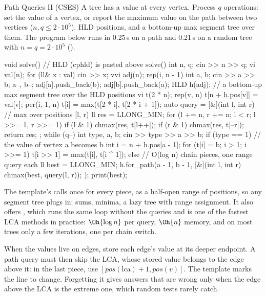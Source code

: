 \begin{problem}{Path Queries II (CSES)}
A tree has a value at every vertex. Process $q$ operations: set the value of a vertex, or report the maximum value on the path
between two vertices ($n, q \le 2 \cdot 10^5$).
\solution HLD positions, and a bottom-up max segment tree over them. The program below runs in 0.25\,s on a path and 0.21\,s on a
random tree with $n = q = 2 \cdot 10^5$ ().
\end{problem}

\begin{code}
void solve() {  // HLD (cphld) is pasted above solve()
    int n, q;
    cin >> n >> q;
    vi val(n);
    for (ll& x : val) cin >> x;
    vvi adj(n);
    rep(i, n - 1) {
        int a, b;
        cin >> a >> b;
        a--, b--;
        adj[a].push_back(b);
        adj[b].push_back(a);
    }
    HLD h(adj);
    // a bottom-up max segment tree over the HLD positions
    vi t(2 * n);
    rep(v, n) t[n + h.pos[v]] = val[v];
    per(i, 1, n) t[i] = max(t[2 * i], t[2 * i + 1]);
    auto query = [&](int l, int r) {  // max over positions [l, r)
        ll res = LLONG_MIN;
        for (l += n, r += n; l < r; l >>= 1, r >>= 1) {
            if (l & 1) chmax(res, t[l++]);
            if (r & 1) chmax(res, t[--r]);
        }
        return res;
    };
    while (q--) {
        int type, a, b;
        cin >> type >> a >> b;
        if (type == 1) {  // the value of vertex a becomes b
            int i = n + h.pos[a - 1];
            for (t[i] = b; i > 1; i >>= 1) t[i >> 1] = max(t[i], t[i ^ 1]);
        } else {  // O(log n) chain pieces, one range query each
            ll best = LLONG_MIN;
            h.for_path(a - 1, b - 1,
                       [&](int l, int r) { chmax(best, query(l, r)); });
            print(best);
        }
    }
}
\end{code}


The template's  calls  once for every piece, as a half-open range of positions, so any
segment tree plugs in: sums, minima, a lazy tree with range assignment. It also offers , which runs the same loop
without the queries and is one of the fastest LCA methods in practice: $\Oh{\log n}$ per query, $\Oh{n}$ memory, and on most
trees only a few iterations, one per chain switch.

\begin{pitfall}
When the values live on edges, store each edge's value at its deeper endpoint. A path query must then skip the LCA, whose stored
value belongs to the edge above it: in the last piece, use $[\mathit{pos}(\mathrm{lca}) + 1, \mathit{pos}(v)]$. The template marks
the line to change. Forgetting it gives answers that are wrong only when the edge above the LCA is the extreme one, which random
tests rarely catch.
\end{pitfall}

